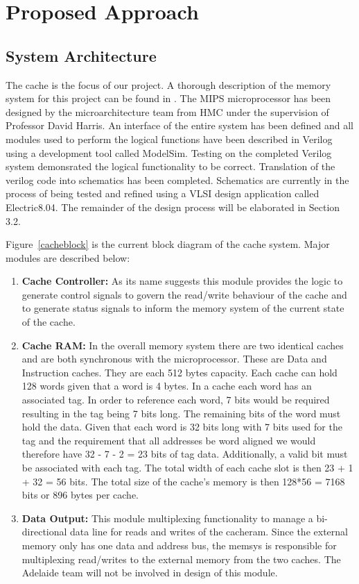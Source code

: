 \section{Proposed Approach}

\subsection{System Architecture}

The cache is the focus of our project. A thorough description of
the memory system for this project can be found in
\cite{various07}. The MIPS microprocessor has been designed by the
microarchitecture team from HMC under the supervision of Professor David
Harris. An interface of the entire system has been defined and all modules used to perform
the logical functions have been described in Verilog using a development tool
called ModelSim. Testing on the completed Verilog system demonsrated the logical
functionality to be correct. Translation of the verilog code into schematics
has been completed. Schematics are currently in the process of being
tested and refined using a VLSI design application called Electric8.04. The
remainder of the design process will be elaborated in Section 3.2.

Figure~\ref{cacheblock} is the current block diagram of
the cache system. Major modules are described below:
\begin{enumerate}
\item \textbf{Cache Controller: }As its name suggests this module provides the logic to generate control signals to govern the read/write behaviour of the cache and to generate status signals to inform the memory system of the current state of the cache.
\item \textbf{Cache RAM: }In the overall memory system there are two identical caches and are both synchronous with the microprocessor. These are Data and Instruction caches. They are each 512 bytes capacity. Each cache can hold 128 words given that a word is 4 bytes. In a cache each word has an associated tag. In order to reference each word, 7 bits would be required resulting in the tag being 7 bits long. The remaining bits of the word must hold the data. Given that each word is 32 bits long with 7 bits used for the tag and the requirement that all addresses be word aligned we would therefore have  32 - 7 - 2 = 23 bits of tag data. Additionally, a valid bit must be associated with each tag. The total width of each cache slot is then 23 + 1 + 32 = 56 bits. The total size of the cache's memory is then 128*56 = 7168 bits or 896 bytes per cache.
\item \textbf{Data Output: }This module multiplexing functionality to manage a bi-directional data line for reads and writes of the cacheram. Since the external memory only has one data and address bus, the memsys is responsible for multiplexing read/writes to the external memory from the two caches. The Adelaide team will not be involved in design of this module.
\end{enumerate}

